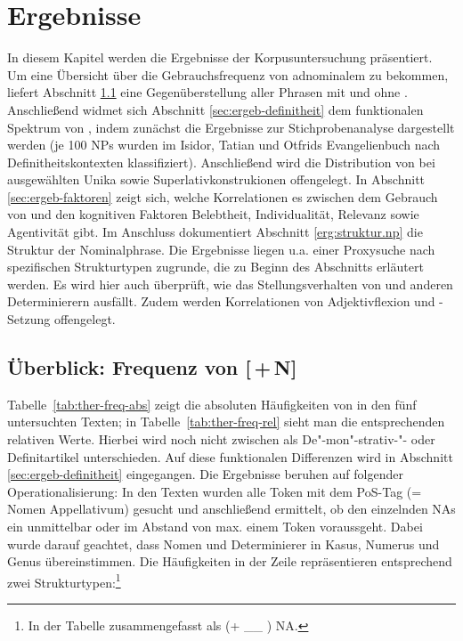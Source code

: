 \chapter{Ergebnisse}\label{ergebnisse}

In diesem Kapitel werden die Ergebnisse der Korpusuntersuchung präsentiert. Um eine Übersicht über die Gebrauchsfrequenz von adnominalem  zu bekommen, liefert Abschnitt \ref{sec:ergeb-ther-freq} eine Gegenüberstellung aller Phrasen mit und ohne . Anschließend widmet sich Abschnitt \ref{sec:ergeb-definitheit} dem funktionalen Spektrum von , indem zunächst die Ergebnisse zur Stichprobenanalyse dargestellt werden (je 100 NPs wurden im Isidor, Tatian und Otfrids Evangelienbuch nach Definitheitskontexten klassifiziert). Anschließend wird die Distribution von  bei ausgewählten Unika sowie Superlativkonstrukionen offengelegt. In Abschnitt \ref{sec:ergeb-faktoren} zeigt sich, welche Korrelationen es zwischen dem Gebrauch von  und den kognitiven Faktoren Belebtheit, Individualität, Relevanz sowie Agentivität gibt. 
Im Anschluss dokumentiert Abschnitt \ref{erg:struktur.np} die Struktur der Nominalphrase. Die Ergebnisse liegen u.a. einer Proxysuche nach spezifischen Strukturtypen zugrunde, die zu Beginn des Abschnitts erläutert werden. Es wird hier auch überprüft, wie das Stellungsverhalten von  und anderen Determinierern ausfällt. Zudem werden Korrelationen von Adjektivflexion  und -Setzung offengelegt. 

\section{Überblick: Frequenz von [\,+\,N]}\label{sec:ergeb-ther-freq}\largerpage

Tabelle~\ref{tab:ther-freq-abs} zeigt die absoluten Häufigkeiten von  in den fünf untersuchten Texten; in Tabelle~\ref{tab:ther-freq-rel} sieht man die entsprechenden relativen Werte. Hierbei wird noch nicht zwischen  als De"-mon"-strativ-"- oder Definitartikel unterschieden. Auf diese funktionalen Differenzen wird in Abschnitt \ref{sec:ergeb-definitheit} eingegangen. Die Ergebnisse beruhen auf folgender Operationalisierung: In den Texten wurden alle Token mit dem PoS-Tag  (=\,Nomen Appellativum) gesucht und anschließend ermittelt, ob den einzelnden NAs ein   unmittelbar oder im  Abstand von max. einem Token voraussgeht. Dabei wurde darauf geachtet, dass Nomen und Determinierer in Kasus, Numerus und Genus übereinstimmen. Die Häufigkeiten in der Zeile  repräsentieren entsprechend zwei Strukturtypen:\footnote{In der Tabelle zusammengefasst als  (+ \_\_ ) NA.}  

